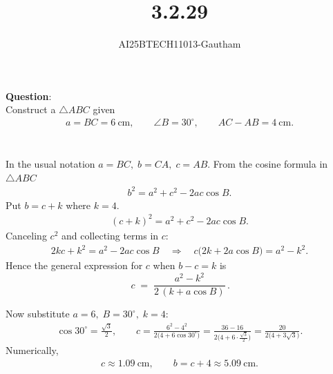 \documentclass[journal]{IEEEtran}
\begin{document}

\vspace{3cm}
\title{3.2.29}
\author{AI25BTECH11013-Gautham}
\maketitle
{\let\newpage\relax\maketitle}
\renewcommand{\thefigure}{\theenumi}
\renewcommand{\thetable}{\theenumi}
\setlength{\intextsep}{10pt} %
\renewcommand{\thetable}{\theenumi}
\textbf{Question}:\\
Construct a $\triangle ABC$ given 
\begin{align}
a = BC = 6\ \text{cm},\qquad \angle B = 30^\circ,\qquad AC - AB = 4\ \text{cm}.\\
\end{align}

\solution \\
In the usual notation $a=BC,\; b=CA,\; c=AB$.  From the cosine formula in $\triangle ABC$\\
\begin{align}
b^2 = a^2 + c^2 - 2ac\cos B. 
\end{align}
Put $b = c + k$ where $k = 4$. 
\begin{align}
(c+k)^2 = a^2 + c^2 - 2ac\cos B.
\end{align}
Canceling $c^2$ and collecting terms in $c$:
\begin{align}
2kc + k^2 = a^2 - 2ac\cos B
\quad\Longrightarrow\quad
c\big(2k + 2a\cos B\big) = a^2 - k^2.
\end{align}
Hence the general expression for $c$ when $b-c=k$ is
\begin{equation}
\boxed{\, c \;=\; \frac{a^2 - k^2}{2\,(k + a\cos B)} \,}. \label{eq:c_general}
\end{equation}

Now substitute $a=6,\; B=30^\circ,\; k=4$:
\begin{align}
\cos 30^\circ = \frac{\sqrt3}{2},\qquad
c = \frac{6^2 - 4^2}{2\big(4 + 6\cos 30^\circ\big)}
= \frac{36 - 16}{2\big(4 + 6\cdot\frac{\sqrt3}{2}\big)}
= \frac{20}{2\big(4 + 3\sqrt3\big)}.
\end{align}
Numerically,
\begin{align}
c \approx 1.09\ \text{cm},\qquad b = c + 4 \approx 5.09\ \text{cm}.
\end{align}
\end{document}

